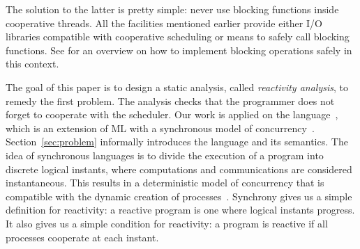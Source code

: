 \documentclass[9pt]{sigplanconf}
\newcommand{\todo}[1]{ {\color{red} #1}}
\begin{document}

The solution to the latter is pretty simple: never use blocking functions inside cooperative threads. All the facilities mentioned earlier provide either I/O libraries compatible with cooperative scheduling or means to safely call blocking functions. See \cite{Marlow:2004} for an overview on how to implement blocking operations safely in this context.


The goal of this paper is to design a static analysis, called \emph{reactivity analysis}, to remedy the first problem. The analysis checks that the programmer does not forget to cooperate with the scheduler.
%
Our work is applied on the \rml language~\cite{Mandel:2005}, which is an extension of ML with a synchronous model of concurrency~\cite{Benveniste:2003}. Section~\ref{sec:problem} informally introduces the language and its semantics. The idea of synchronous languages is to divide the execution of a program into discrete logical instants, where computations and communications are considered instantaneous. This results in a deterministic model of concurrency that is compatible with the dynamic creation of processes~\cite{Boussinot:1991}.  Synchrony gives us a simple definition for reactivity: a reactive \rml program is one where logical instants progress. It also gives us a simple condition for reactivity: a program is reactive if all processes cooperate at each instant.  %
\end{document}
